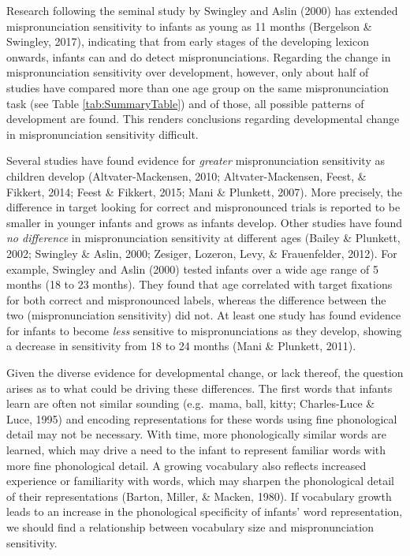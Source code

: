 \documentclass[man]{apa6}
\begin{document}
Research following the seminal study by Swingley and Aslin (2000) has extended mispronunciation sensitivity to infants as young as 11 months (Bergelson \& Swingley, 2017), indicating that from early stages of the developing lexicon onwards, infants can and do detect mispronunciations. Regarding the change in mispronunciation sensitivity over development, however, only about half of studies have compared more than one age group on the same mispronunciation task (see Table \ref{tab:SummaryTable}) and of those, all possible patterns of development are found. This renders conclusions regarding developmental change in mispronunciation sensitivity difficult.

Several studies have found evidence for \emph{greater} mispronunciation sensitivity as children develop (Altvater-Mackensen, 2010; Altvater-Mackensen, Feest, \& Fikkert, 2014; Feest \& Fikkert, 2015; Mani \& Plunkett, 2007). More precisely, the difference in target looking for correct and mispronounced trials is reported to be smaller in younger infants and grows as infants develop. Other studies have found \emph{no difference} in mispronunciation sensitivity at different ages (Bailey \& Plunkett, 2002; Swingley \& Aslin, 2000; Zesiger, Lozeron, Levy, \& Frauenfelder, 2012). For example, Swingley and Aslin (2000) tested infants over a wide age range of 5 months (18 to 23 months). They found that age correlated with target fixations for both correct and mispronounced labels, whereas the difference between the two (mispronunciation sensitivity) did not. At least one study has found evidence for infants to become \emph{less} sensitive to mispronunciations as they develop, showing a decrease in sensitivity from 18 to 24 months (Mani \& Plunkett, 2011).

Given the diverse evidence for developmental change, or lack thereof, the question arises as to what could be driving these differences. The first words that infants learn are often not similar sounding (e.g.~mama, ball, kitty; Charles-Luce \& Luce, 1995) and encoding representations for these words using fine phonological detail may not be necessary. With time, more phonologically similar words are learned, which may drive a need to the infant to represent familiar words with more fine phonological detail. A growing vocabulary also reflects increased experience or familiarity with words, which may sharpen the phonological detail of their representations (Barton, Miller, \& Macken, 1980). If vocabulary growth leads to an increase in the phonological specificity of infants' word representation, we should find a relationship between vocabulary size and mispronunciation sensitivity.
\end{document}
